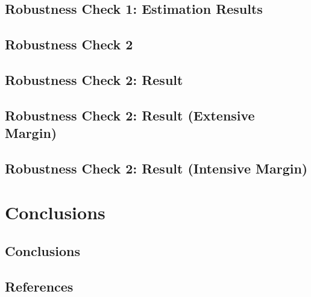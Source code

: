 \documentclass[ review  , 3p ]{elsarticle}
\begin{document}
  \hypertarget{robustness-check-1-estimation-results}{%
  \subsection{Robustness Check 1: Estimation Results}\label{robustness-check-1-estimation-results}}
  
  \hypertarget{robustness-check-2}{%
  \subsection{Robustness Check 2}\label{robustness-check-2}}
  
  \hypertarget{robustness-check-2-result}{%
  \subsection{Robustness Check 2: Result}\label{robustness-check-2-result}}
  
  \hypertarget{robustness-check-2-result-extensive-margin}{%
  \subsection{Robustness Check 2: Result (Extensive Margin)}\label{robustness-check-2-result-extensive-margin}}
  
  \hypertarget{robustness-check-2-result-intensive-margin}{%
  \subsection{Robustness Check 2: Result (Intensive Margin)}\label{robustness-check-2-result-intensive-margin}}
  
  \hypertarget{conclusions}{%
  \section{Conclusions}\label{conclusions}}
  
  \hypertarget{conclusions-1}{%
  \subsection{Conclusions}\label{conclusions-1}}
  
  \clearpage
  
  \hypertarget{references}{%
  \subsection*{References}\label{references}}
\end{document}
